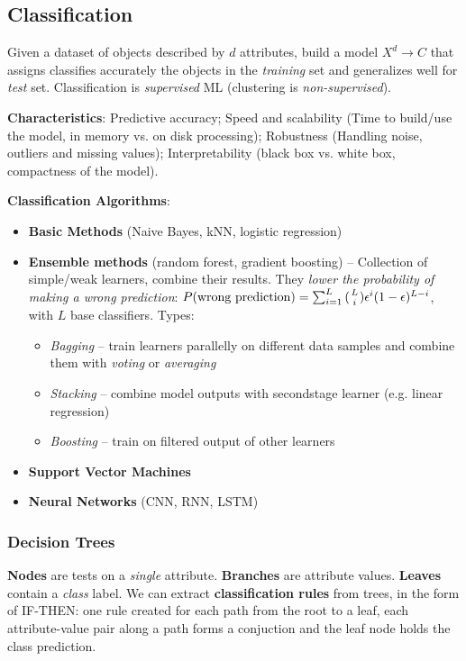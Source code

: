 \subsection{Classification} %
\label{sub:classification}
  Given a dataset of objects described by $d$ attributes, build a model $X^d\rightarrow C$ that assigns classifies accurately the objects in the \emph{training} set and generalizes well for \emph{test} set. Classification is \emph{supervised} ML (clustering is \emph{non-supervised}).

  \textbf{Characteristics}: Predictive accuracy; Speed and scalability (Time to build/use the model, in memory vs. on disk processing); Robustness (Handling noise, outliers and missing values); Interpretability (black box vs. white box, compactness of the model).

  \textbf{Classification Algorithms}:
  \begin{itemize}
    \item \textbf{Basic Methods} (Naive Bayes, kNN, logistic regression)
    \item \textbf{Ensemble methods} (random forest, gradient boosting) -- Collection of simple/weak learners, combine their results. They \emph{lower the probability of making a wrong prediction}: $P(\text{wrong prediction})=\sum_{i=1}^{L}{(\genfrac{}{}{0pt}{}{L}{i})\epsilon^i(1-\epsilon)^{L-i}}$, with $L$ base classifiers. Types:
    \begin{itemize}
      \item \emph{Bagging} -- train learners parallelly on different data samples and combine them with \emph{voting} or \emph{averaging}
      \item \emph{Stacking} -- combine model outputs with secondstage learner (e.g. linear regression)
      \item \emph{Boosting} -- train on filtered output of other learners
    \end{itemize}
    \item \textbf{Support Vector Machines}
    \item \textbf{Neural Networks} (CNN, RNN, LSTM)
  \end{itemize}
  \subsubsection{Decision Trees} %
  \label{ssub:decision_trees}
    \textbf{Nodes} are tests on a \emph{single} attribute. \textbf{Branches} are attribute values. \textbf{Leaves} contain a \emph{class} label. We can extract \textbf{classification rules} from trees, in the form of IF-THEN: one rule created for each path from the root to a leaf, each attribute-value pair along a path forms a conjuction and the leaf node holds the class prediction.


